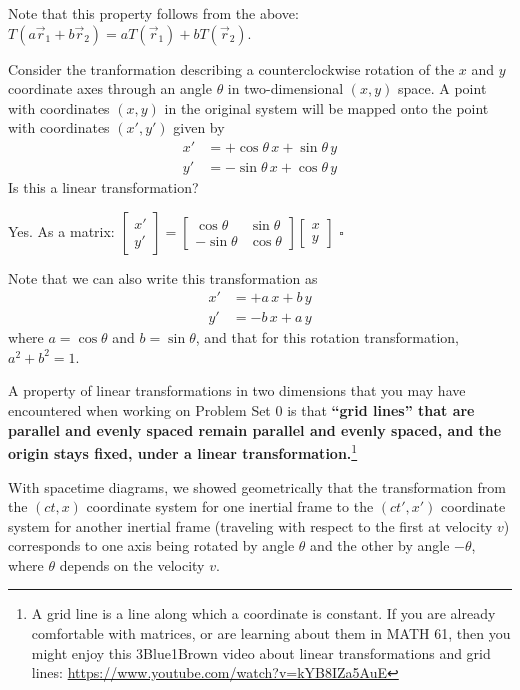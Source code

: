 \documentclass[11pt, letterpaper, openany]{book}
\newenvironment{exercise}[1][Exercise]{%
  \tcolorbox[blanker, breakable, left=1em,
    before skip=1em, after skip=1em,
    borderline west={3pt}{0pt}{PhysNavy},
    colback=PhysCream,
    before upper={\textcolor{PhysNavy}{\sffamily\bfseries #1:}\space}
  ]%
}{%
  \endtcolorbox%
}
\newenvironment{solution}[1][Solution]{%
  \tcolorbox[blanker, breakable, left=1em,
    before skip=1em, after skip=1em,
    borderline west={2pt}{0pt}{PhysTeal},
    colback=PhysCream,
    before upper={\textcolor{PhysTeal}{\sffamily\bfseries #1.}\space}
  ]%
}{%
  \hfill\textcolor{PhysTeal}{\ensuremath{\square}}\endtcolorbox%
}
\begin{document}
Note that this property follows from the above: $T(a\vec{r}_1 + b\vec{r}_2) = aT(\vec{r}_1) + bT(\vec{r}_2)$.

\begin{exercise}[Exercise 1]
Consider the tranformation describing a counterclockwise rotation of the $x$ and $y$ coordinate axes through an angle $\theta$ in two-dimensional $(x, y)$ space. A point with coordinates $(x, y)$ in the original system will be mapped onto the point with coordinates $(x', y')$ given by
\begin{align*}
    x' &= +\cos\theta \, x + \sin\theta \, y \\
    y' &= -\sin\theta \, x + \cos\theta \, y 
\end{align*}
Is this a linear transformation?
\end{exercise}
\begin{solution}
Yes. As a matrix: $\begin{bmatrix} x' \\ y' \end{bmatrix} = \begin{bmatrix} \cos\theta & \sin\theta \\ -\sin\theta & \cos\theta \end{bmatrix} \begin{bmatrix} x \\ y \end{bmatrix}$
\end{solution}

Note that we can also write this transformation as
\begin{align*}
    x' &= +a \, x + b \, y \\
    y' &= -b \, x + a \, y
\end{align*}
where $a = \cos\theta$ and $b = \sin\theta$, and that for this rotation transformation, $a^2 + b^2 = 1$.

A property of linear transformations in two dimensions that you may have encountered when working on Problem Set 0 is that \textbf{``grid lines'' that are parallel and evenly spaced remain parallel and evenly spaced, and the origin stays fixed, under a linear transformation.}\footnote{A grid line is a line along which a coordinate is constant. If you are already comfortable with matrices, or are learning about them in MATH 61, then you might enjoy this 3Blue1Brown video about linear transformations and grid lines: \url{https://www.youtube.com/watch?v=kYB8IZa5AuE}}

With spacetime diagrams, we showed geometrically that the transformation from the $(ct, x)$ coordinate system for one inertial frame to the $(ct', x')$ coordinate system for another inertial frame (traveling with respect to the first at velocity $v$) corresponds to one axis being rotated by angle $\theta$ and the other by angle $-\theta$, where $\theta$ depends on the velocity $v$.
\end{document}
